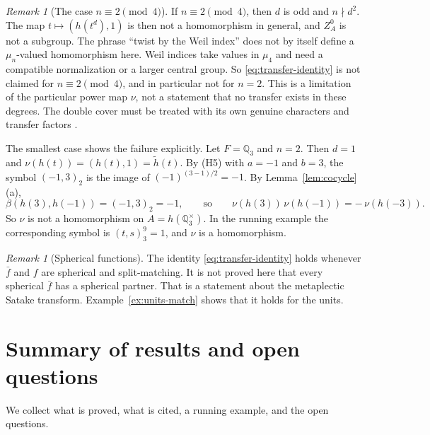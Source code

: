 \documentclass[12pt,letterpaper]{article}
\numberwithin{equation}{section}
\theoremstyle{plain}
\theoremstyle{definition}
\theoremstyle{remark}
\newtheorem{remark}[theorem]{Remark}
\newcommand{\hl}{\tilde h}
\newcommand{\Qq}{\mathbb Q}
\newcommand{\ZA}{Z_A}
\begin{document}
\begin{remark}[The case $n\equiv2\pmod4$]\label{rem:weil}
If $n\equiv2\pmod4$, then $d$ is odd and $n\nmid d^2$. The map
$t\mapsto(h(t^d),1)$ is then not a homomorphism in general, and
$\ZA^0$ is not a subgroup. The phrase ``twist by the Weil index'' does
not by itself define a $\mu_n$-valued homomorphism here. Weil indices
take values in $\mu_4$ and need a compatible normalization or a larger
central group. So \eqref{eq:transfer-identity} is not claimed for
$n\equiv2\pmod4$, and in particular not for $n=2$. This is a limitation
of the particular power map $\nu$, not a statement that no transfer
exists in these degrees. The double cover must be treated with its own
genuine characters and transfer factors \cite{Ge76,GS75,Fl80,Sc98}.

The smallest case shows the failure explicitly. Let $F=\Qq_3$ and
$n=2$. Then $d=1$ and $\nu(h(t))=(h(t),1)=\hl(t)$. By (H5) with
$a=-1$ and $b=3$, the symbol $(-1,3)_2$ is the image of
$(-1)^{(3-1)/2}=-1$. By Lemma~\ref{lem:cocycle}(a),
\[
\beta(h(3),h(-1))=(-1,3)_2=-1,\qquad\text{so}\qquad
\nu(h(3))\,\nu(h(-1))=-\,\nu(h(-3)).
\]
So $\nu$ is not a homomorphism on $A=h(\Qq_3^\times)$. In the running
example the corresponding symbol is $(t,s)_3^{9}=1$, and $\nu$ is a
homomorphism.
\end{remark}

\begin{remark}[Spherical functions]\label{rem:spherical}
The identity \eqref{eq:transfer-identity} holds whenever $\bar f$ and
$f$ are spherical and split-matching. It is not proved here that every
spherical $\bar f$ has a spherical partner. That is a statement about
the metaplectic Satake transform. Example~\ref{ex:units-match} shows
that it holds for the units.
\end{remark}

\section{Summary of results and open questions}\label{sec:limitations}

We collect what is proved, what is cited, a running example, and the
open questions.
\end{document}

